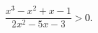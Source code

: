 \begin{ex}[type=inequality]
	\begin{condition}
		$\dfrac{x^3 - x^2 + x - 1}{2x^2 - 5x - 3}>0 .$
	\end{condition}
\end{ex}